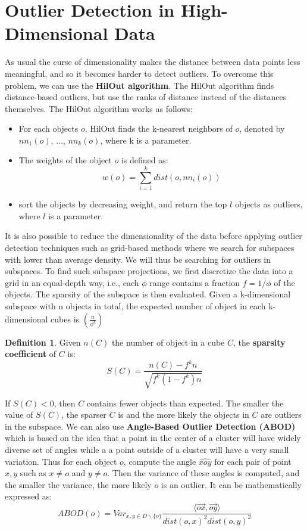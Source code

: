 \documentclass[12pt, openany]{report}
\theoremstyle{definition}
\newtheorem{definition}[thm]{Definition}
\begin{document}
\section{Outlier Detection in High-Dimensional Data}
As usual the curse of dimensionality makes the distance between data points less meaningful, and so it becomes harder to detect outliers. To overcome this problem, we can use the \textbf{HilOut algorithm}. The HilOut algorithm finds distance-based outliers, but use the ranks of distance instead of the distances themselves. The HilOut algorithm works as follows:
\begin{itemize}
    \item For each objects $o$, HilOut finds the k-nearest neighbors of $o$, denoted by $nn_1(o)$, $\dots$, $nn_k (o)$, where k is a parameter.
    \item The weights of the object $o$ is defined as:
    \begin{equation}    
        w(o) = \sum_{i=1}^{k} dist(o, nn_i(o))
    \end{equation}
    \item sort the objects by decreasing weight, and return the top $l$ objects as outliers, where $l$ is a parameter.
\end{itemize}
It is also possible to reduce the dimensionality of the data before applying outlier detection techniques such as grid-based methods where we search for subspaces with lower than average density. We will thus be searching for outliers in subspaces. To find such subspace projections, we first discretize the data into a grid in an equal-depth way, i.e., each $\phi$ range contains a fraction $f = 1/\phi$ of the objects. The sparsity of the subspace is then evaluated. Given a k-dimensional subspace with n objects in total, the expected number of object in each k-dimensional cubes is $(\frac{n}{\phi^k})$
\begin{definition}
    Given $n(C)$ the number of object in a cube $C$, the \textbf{sparsity coefficient} of $C$ is:
    \begin{equation}
        S(C) = \frac{n(C) - f^kn}{\sqrt{f^k(1-f^k)n}}
    \end{equation}
\end{definition}
If $S(C ) < 0$, then $C$ contains fewer objects than expected. The smaller the value of $S(C )$, the sparser $C$ is and the more likely the objects in $C$ are outliers in the subspace.
We can also use \textbf{Angle-Based Outlier Detection (ABOD)} which is based on the idea that a point in the center of a cluster will have widely diverse set of angles while a a point outside of a cluster will have a very small variation. Thus for each object $o$, compute the angle $\widehat{xoy}$ for each pair of point $x, y$ such as $x \neq o$ and $y \neq o$. Then the variance of these angles is computed, and the smaller the variance, the more likely $o$ is an outlier. It can be mathematically expressed as:
\begin{equation}
    ABOD(o) = Var_{x,y \in D\backslash \{o\}} \frac{\langle \vec{ox}, \vec{oy} \rangle}{dist(o, x)^2dist(o, y)^2}
\end{equation}
\end{document}
